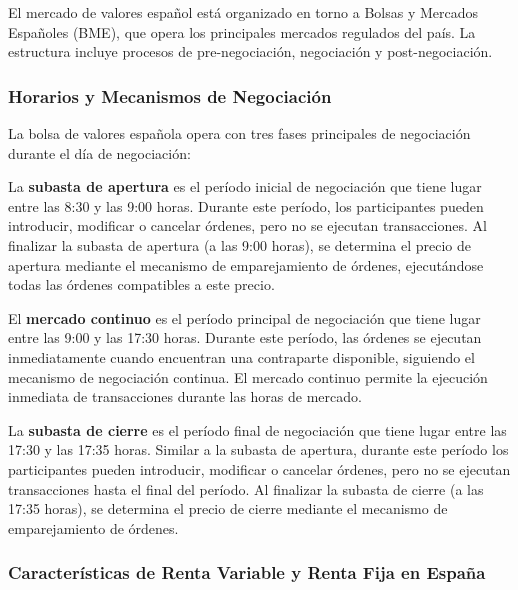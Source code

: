 El mercado de valores español está organizado en torno a Bolsas y Mercados Españoles (BME), que opera los principales mercados regulados del país. La estructura incluye procesos de pre-negociación, negociación y post-negociación.

\subsubsection{Horarios y Mecanismos de Negociación}

La bolsa de valores española opera con tres fases principales de negociación durante el día de negociación:

\begin{definicion}
La \textbf{subasta de apertura} es el período inicial de negociación que tiene lugar entre las 8:30 y las 9:00 horas. Durante este período, los participantes pueden introducir, modificar o cancelar órdenes, pero no se ejecutan transacciones. Al finalizar la subasta de apertura (a las 9:00 horas), se determina el precio de apertura mediante el mecanismo de emparejamiento de órdenes, ejecutándose todas las órdenes compatibles a este precio.
\end{definicion}

\begin{definicion}
El \textbf{mercado continuo} es el período principal de negociación que tiene lugar entre las 9:00 y las 17:30 horas. Durante este período, las órdenes se ejecutan inmediatamente cuando encuentran una contraparte disponible, siguiendo el mecanismo de negociación continua. El mercado continuo permite la ejecución inmediata de transacciones durante las horas de mercado.
\end{definicion}

\begin{definicion}
La \textbf{subasta de cierre} es el período final de negociación que tiene lugar entre las 17:30 y las 17:35 horas. Similar a la subasta de apertura, durante este período los participantes pueden introducir, modificar o cancelar órdenes, pero no se ejecutan transacciones hasta el final del período. Al finalizar la subasta de cierre (a las 17:35 horas), se determina el precio de cierre mediante el mecanismo de emparejamiento de órdenes.
\end{definicion}

\subsubsection{Características de Renta Variable y Renta Fija en España}

